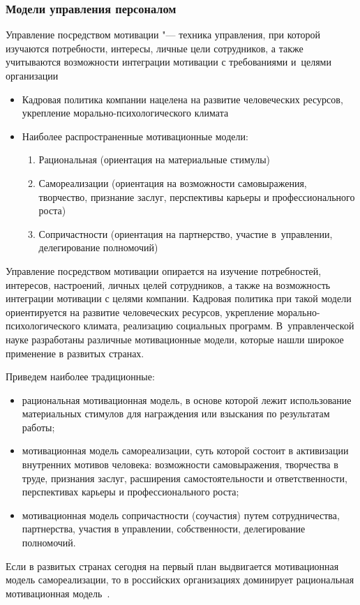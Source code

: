 \documentclass{../industrial-development}
\begin{document}
\begin{frame} \frametitle{Модели управления персоналом}
 \alert{Управление посредством мотивации} "--- техника управления, при которой изучаются потребности, интересы, личные цели сотрудников, а также учитываются возможности интеграции мотивации с требованиями и~целями организации
	  \begin{itemize}
	\item Кадровая политика компании нацелена на развитие человеческих ресурсов, укрепление морально-психологического климата
		\item Наиболее распространенные мотивационные модели:
		\begin{enumerate}
	\item	Рациональная (ориентация на материальные стимулы)
	\item Самореализации (ориентация на возможности самовыражения,
творчество, признание заслуг, перспективы карьеры и профессионального роста)
\item Сопричастности (ориентация на партнерство, участие в~управлении, делегирование полномочий)
	\end{enumerate}
	\end{itemize}
\end{frame}
\lecturenotes

\alert{Управление посредством мотивации} опирается на изучение потребностей, интересов, настроений, личных целей сотрудников, а также на возможность интеграции мотивации с целями компании. Кадровая политика при такой модели ориентируется на развитие человеческих ресурсов, укрепление морально-психологического климата, реализацию социальных программ. В~управленческой науке разработаны различные мотивационные модели, которые нашли широкое применение в развитых странах.
 
Приведем наиболее традиционные:
	  \begin{itemize}
\item рациональная мотивационная модель, в основе которой лежит использование материальных стимулов для награждения или взыскания по результатам работы;
\item мотивационная модель самореализации, суть которой состоит в активизации внутренних мотивов человека: возможности самовыражения, творчества в труде, признания заслуг, расширения самостоятельности и ответственности, перспективах карьеры и профессионального роста;
\item мотивационная модель сопричастности (соучастия) путем сотрудничества, партнерства, участия в управлении, собственности, делегирование полномочий.
	\end{itemize}
Если в развитых странах сегодня на первый план выдвигается мотивационная модель самореализации, то в российских организациях доминирует рациональная мотивационная модель~\cite{Porshnev}. 
\end{document}
